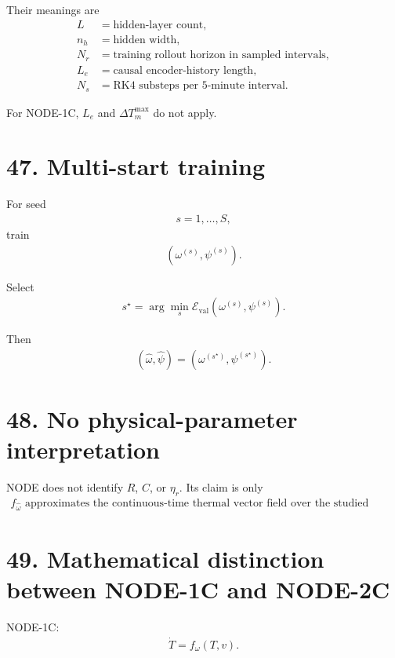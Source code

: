 \documentclass[11pt]{article}
\begin{document}
Their meanings are
\begin{align}
L&=\text{hidden-layer count},\\
n_h&=\text{hidden width},\\
N_r&=\text{training rollout horizon in sampled intervals},\\
L_e&=\text{causal encoder-history length},\\
N_s&=\text{RK4 substeps per 5-minute interval}.
\end{align}

For NODE-1C, \(L_e\) and \(\Delta T_m^{\max}\) do not apply.

\section*{47. Multi-start training}

For seed
\begin{align}
s=1,\ldots,S,
\end{align}
train
\begin{align}
(\omega^{(s)},\psi^{(s)}).
\end{align}

Select
\begin{align}
\boxed{
s^\star
=
\arg\min_s
\mathcal E_{\mathrm{val}}
(\omega^{(s)},\psi^{(s)}).
}
\tag{N3.155}
\end{align}

Then
\begin{align}
\boxed{
(\widehat\omega,\widehat\psi)
=
(\omega^{(s^\star)},\psi^{(s^\star)}).
}
\tag{N3.156}
\end{align}

\section*{48. No physical-parameter interpretation}

NODE does not identify \(R\), \(C\), or \(\eta_r\). Its claim is only
\begin{align}
\boxed{
f_{\widehat\omega}
\text{ approximates the continuous-time thermal vector field over the studied operating domain.}
}
\tag{N3.157}
\end{align}

\section*{49. Mathematical distinction between NODE-1C and NODE-2C}

NODE-1C:
\begin{align}
\boxed{
\dot T=f_\omega(T,v).
}
\tag{N3.158}
\end{align}
\end{document}
